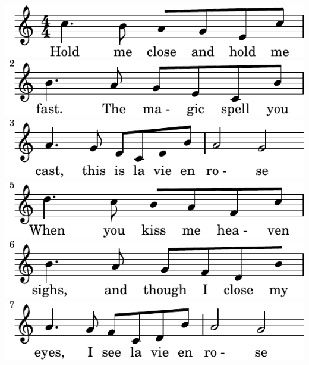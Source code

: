 \includegraphics{d8/lily-0382198f-1}%
\ifx\betweenLilyPondSystem \undefined
  \linebreak
\else
  \expandafter{}%
\fi
\includegraphics{d8/lily-0382198f-2}%
\ifx\betweenLilyPondSystem \undefined
  \linebreak
\else
  \expandafter{}%
\fi
\includegraphics{d8/lily-0382198f-3}%
\ifx\betweenLilyPondSystem \undefined
  \linebreak
\else
  \expandafter{}%
\fi
\includegraphics{d8/lily-0382198f-4}%
\ifx\betweenLilyPondSystem \undefined
  \linebreak
\else
  \expandafter{}%
\fi
\includegraphics{d8/lily-0382198f-5}%
\ifx\betweenLilyPondSystem \undefined
  \linebreak
\else
  \expandafter{}%
\fi
\includegraphics{d8/lily-0382198f-6}%
